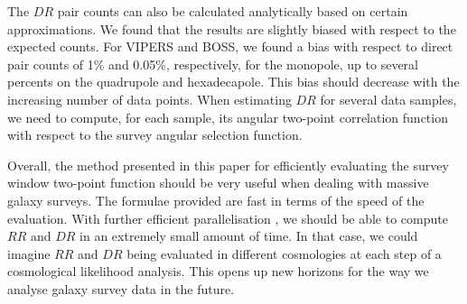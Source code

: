 \documentclass{aa}
\begin{document}
The $DR$ pair counts can also be calculated analytically based on certain approximations. We found that the results are slightly biased with respect to the expected counts. For VIPERS and BOSS, we found a bias with respect to direct pair counts of 1\% and 0.05\%, respectively, for the monopole, up to several percents on the quadrupole and hexadecapole. This bias should decrease with the increasing number of data points. When estimating $DR$ for several data samples, we need to compute, for each sample, its angular two-point correlation function with respect to the survey angular selection function.

Overall, the method presented in this paper for efficiently evaluating the survey window two-point function should be very useful when dealing with massive galaxy surveys. The  formulae provided are fast in terms of the speed of the evaluation. With further efficient parallelisation \citep[e.g.][]{hahn2015concurrent}, we should be able to compute $RR$ and $DR$ in an extremely small amount of time. In that case, we could imagine $RR$ and $DR$ being evaluated in different cosmologies at each step of a cosmological likelihood analysis. This opens up new horizons for the way we analyse galaxy survey data in the future.

\end{document}

